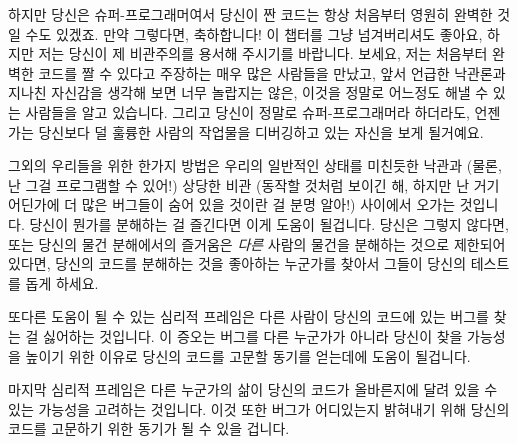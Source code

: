 하지만 당신은 슈퍼-프로그래머여서 당신이 짠 코드는 항상 처음부터 영원히 완벽한
것일 수도 있겠죠.
만약 그렇다면, 축하합니다!
이 챕터를 그냥 넘겨버리셔도 좋아요, 하지만 저는 당신이 제 비관주의를 용서해
주시기를 바랍니다.
보세요, 저는 처음부터 완벽한 코드를 짤 수 있다고 주장하는 매우 많은 사람들을
만났고, 앞서 언급한 낙관론과 지나친 자신감을 생각해 보면 너무 놀랍지는 않은,
이것을 정말로 어느정도 해낼 수 있는 사람들을 알고 있습니다.
그리고 당신이 정말로 슈퍼-프로그래머라 하더라도, 언젠가는 당신보다 덜 훌륭한
사람의 작업물을 디버깅하고 있는 자신을 보게 될거예요.

그외의 우리들을 위한 한가지 방법은 우리의 일반적인 상태를 미친듯한 낙관과
(물론, 난 그걸 프로그램할 수 있어!) 상당한 비관 (동작할 것처럼 보이긴 해,
하지만 난 거기 어딘가에 더 많은 버그들이 숨어 있을 것이란 걸 분명 알아!)
사이에서 오가는 것입니다.
당신이 뭔가를 분해하는 걸 즐긴다면 이게 도움이 될겁니다.
당신은 그렇지 않다면, 또는 당신의 물건 분해에서의 즐거움은 \emph{다른} 사람의
물건을 분해하는 것으로 제한되어 있다면, 당신의 코드를 분해하는 것을 좋아하는
누군가를 찾아서 그들이 당신의 테스트를 돕게 하세요.

또다른 도움이 될 수 있는 심리적 프레임은 다른 사람이 당신의 코드에 있는 버그를
찾는 걸 싫어하는 것입니다.
이 증오는 버그를 다른 누군가가 아니라 당신이 찾을 가능성을 높이기 위한 이유로
당신의 코드를 고문할 동기를 얻는데에 도움이 될겁니다.

마지막 심리적 프레임은 다른 누군가의 삶이 당신의 코드가 올바른지에 달려 있을 수
있는 가능성을 고려하는 것입니다.
이것 또한 버그가 어디있는지 밝혀내기 위해 당신의 코드를 고문하기 위한 동기가 될
수 있을 겁니다.

